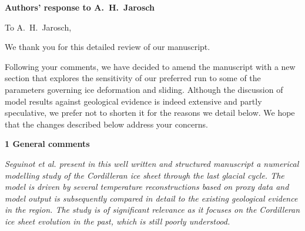 


\textbf{Authors' response to A.~H.~Jarosch}
\bigskip


\newcommand{\doi}[1]{doi:\allowbreak\href{http://dx.doi.org/#1}{#1}}
\newcommand{\tophline}{\noalign{\vspace{1ex}}\hline\noalign{\vspace{1mm}}}
\newcommand{\middlehline}{\noalign{\vspace{1mm}}\hline\noalign{\vspace{1mm}}}
\newcommand{\bottomhline}{\noalign{\vspace{1mm}}\hline}
\newcommand{\belowtable}[1]{\par\vspace{1ex}\raggedleft{\scriptsize#1}}

\newcommand{\sechead}[1]{\bigskip\noindent\textbf{#1}}
\newcommand{\referee}[1]{\bigskip\textcolor{journalname}{\textit{#1}}}
\newcommand{\msquote}[1]{\begin{quote}\textit{#1}\end{quote}}

To A.~H.~Jarosch,

We thank you for this detailed review of our manuscript.

Following your comments, we have decided to amend the manuscript with a new
section that explores the sensitivity of our preferred run to some of the
parameters governing ice deformation and sliding. Although the discussion of
model results against geological evidence is indeed extensive and partly
speculative, we prefer not to shorten it for the reasons we detail below.
We hope that the changes described below address your concerns.


\sechead{1 \quad General comments}

\referee{%
    Seguinot et al. present in this well written and structured manuscript a
    numerical modelling study of the Cordilleran ice sheet through the last
    glacial cycle. The model is driven by several temperature reconstructions
    based on proxy data and model output is subsequently compared in detail to
    the existing geological evidence in the region. The study is of significant
    relevance as it focuses on the Cordilleran ice sheet evolution in the past,
    which is still poorly understood.}

